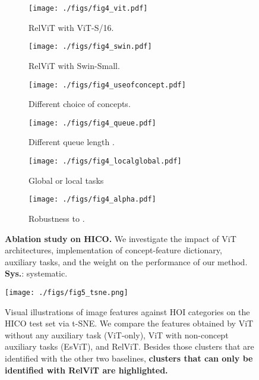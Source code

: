 \documentclass{article} \usepackage{iclr2022_conference,times}
\begin{document}
\begin{figure}[t!]
     \centering
     \begin{subfigure}[b]{0.32\textwidth}
         \centering
         \texttt{[image: ./figs/fig4\_vit.pdf]}
         \vskip-0.08in
         \caption{RelViT with ViT-S/16.}
         \label{fig:a}
     \end{subfigure}
     \hfill
     \begin{subfigure}[b]{0.32\textwidth}
         \centering
         \texttt{[image: ./figs/fig4\_swin.pdf]}
         \vskip-0.08in
         \caption{RelViT with Swin-Small.}
         \label{fig:b}
     \end{subfigure}
     \hfill
     \begin{subfigure}[b]{0.32\textwidth}
         \centering
         \texttt{[image: ./figs/fig4\_useofconcept.pdf]}
         \vskip-0.08in
         \caption{Different choice of concepts.}
         \label{fig:c}
     \end{subfigure}
     \vfill
         \begin{subfigure}[b]{0.32\textwidth}
         \centering
         \texttt{[image: ./figs/fig4\_queue.pdf]}
         \vskip-0.08in
         \caption{Different queue length .}
         \label{fig:d}
     \end{subfigure}
     \hfill
     \begin{subfigure}[b]{0.32\textwidth}
         \centering
         \texttt{[image: ./figs/fig4\_localglobal.pdf]}
         \vskip-0.08in
         \caption{Global or local tasks}
         \label{fig:e}
     \end{subfigure}
     \hfill
     \begin{subfigure}[b]{0.32\textwidth}
         \centering
         \texttt{[image: ./figs/fig4\_alpha.pdf]}
         \vskip-0.13in
         \caption{Robustness to .}
         \label{fig:f}
     \end{subfigure}
    \vskip-0.1in
     \caption{\textbf{Ablation study on HICO.} We investigate the impact of ViT architectures, implementation of concept-feature dictionary, auxiliary tasks, and the weight  on the performance of our method. \textbf{Sys.}: systematic.}
     \label{fig:ablation}
\end{figure}


\begin{figure}[t]
    \vskip -0.15in
    \centering
    \texttt{[image: ./figs/fig5\_tsne.png]}
    \vskip-0.2in
    \caption{Visual illustrations of image features against HOI categories on the HICO test set via t-SNE. We compare the features obtained by ViT without any auxiliary task (ViT-only), ViT with non-concept auxiliary tasks (EsViT), and RelViT. Besides those clusters that are identified with the other two baselines, \textbf{clusters that can only be identified with RelViT are highlighted.}}
    \label{fig:tsne}
        \vskip-0.15in
\end{figure}
\end{document}
